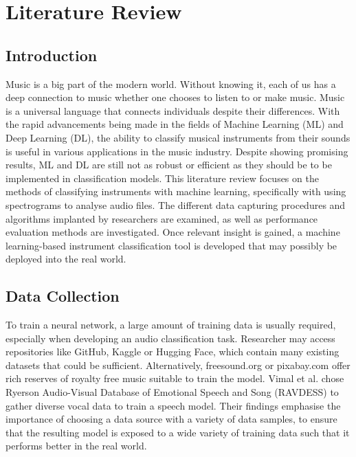 % 
% 
% 
\section{Literature Review \label{ch:literature}}
\vspace{0.5cm}

\subsection{Introduction}

Music is a big part of the modern world. Without knowing it, each of us has a deep connection to music whether one chooses to listen to or make music. Music is a universal language that connects individuals despite their differences. With the rapid advancements being made in the fields of Machine Learning (ML) and Deep Learning (DL), the ability to classify musical instruments from their sounds is useful in various applications in the music industry. Despite showing promising results, ML and DL are still not as robust or efficient as they should be to be implemented in classification models. This literature review focuses on the methods of classifying instruments with machine learning, specifically with using spectrograms to analyse audio files. The different data capturing procedures and algorithms implanted by researchers are examined, as well as performance evaluation methods are investigated. Once relevant insight is gained, a machine learning-based instrument classification tool is developed that may possibly be deployed into the real world. 

\subsection{Data Collection}

To train a neural network, a large amount of training data is usually required, especially when developing an audio classification task. Researcher may access repositories like GitHub, Kaggle or Hugging Face, which contain many existing datasets that could be sufficient. Alternatively, freesound.org or pixabay.com offer rich reserves of royalty free music suitable to train the model. 
Vimal et al. chose Ryerson Audio-Visual Database of Emotional Speech and Song (RAVDESS) to gather diverse vocal data to train a speech model. Their findings emphasise the importance of choosing a data source with a variety of data samples, to ensure that the resulting model is exposed to a wide variety of training data such that it performs better in the real world. 

